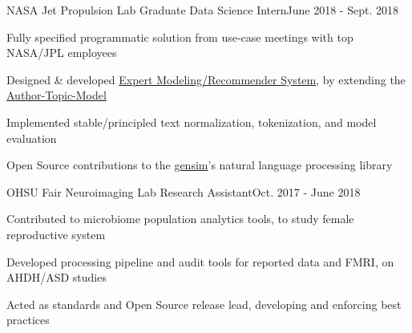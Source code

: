 \documentclass{article}
\newenvironment{**mylist}[2]{
  \subsubsection*{#1\hfill\small#2}
  \small
  \begin{list}{}{}
    \setlength{\topsep}{0pt}
   \setlength{\itemsep}{1pt}
   \setlength{\parskip}{0pt}
   \setlength{\parsep}{0pt}}{\end{list}\normalsize}
\newcommand{\LU}[1]{\hspace{-1em}{\bf Technologies : #1}}
\begin{document}
\begin{**mylist}{NASA Jet Propulsion Lab \tabb Graduate Data Science Intern}{June 2018 - Sept. 2018}
\item Fully specified programmatic solution from use-case meetings with top NASA/JPL employees
\item Designed \& developed \href{https://github.com/probinso/expert-modeling-system}{Expert Modeling/Recommender System}, by extending the \href{https://mimno.infosci.cornell.edu/info6150/readings/398.pdf}{Author-Topic-Model} %
\item Implemented stable/principled text normalization, tokenization, and model evaluation
\item Open Source contributions to the \href{https://github.com/RaRe-Technologies/gensim}{gensim}'s natural language processing library
\item \LU{Python, nltk, gensim, pyLDAvis, pandas, Jupyter}
\end{**mylist}

\begin{**mylist}{OHSU Fair Neuroimaging Lab \tabb Research Assistant}{Oct. 2017 - June 2018}
\item Contributed to microbiome population analytics tools, to study female reproductive system
\item Developed processing pipeline and audit tools for reported data and FMRI, on AHDH/ASD studies
\item  Acted as standards and Open Source release lead, developing and enforcing best practices
\item \LU{Python, Bash, R, neo4j, ponyorm, stan, GitLab, Docker}
\end{**mylist}
\end{document}
